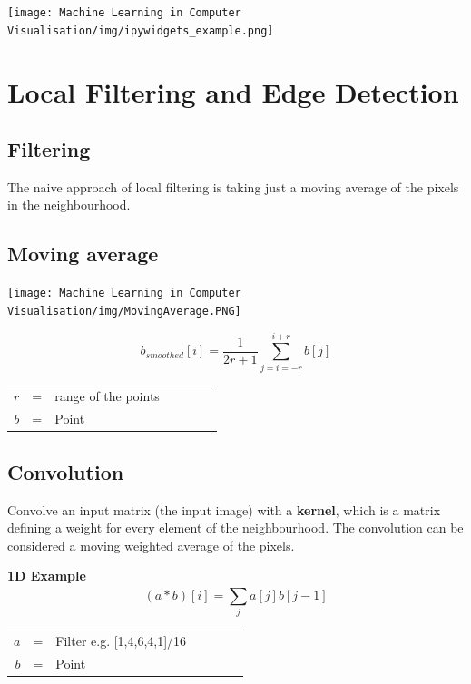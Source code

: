 \documentclass[x11names,11pt,a4paper]{article}
\theoremstyle{definition}
\begin{document}
\begin{center}
	\texttt{[image: Machine Learning in Computer Visualisation/img/ipywidgets\_example.png]}
\end{center}


\section{Local Filtering and Edge Detection}
\subsection{Filtering}
The naive approach of local filtering is taking just a moving average of the pixels in the neighbourhood.

\subsection{Moving average}
\begin{center}
	\texttt{[image: Machine Learning in Computer Visualisation/img/MovingAverage.PNG]}
\end{center}
\begin{equation}
     b_{smoothed}[i] = \frac{1}{2r+1} \sum_{j=i=-r}^{i+r} b[j] 
\end{equation}

 \begin{center}\begin{tabular}{rclcrcl}
   $r$ & = & range of the points  \\ 
   $b$ & = & Point \\
\end{tabular}\end{center}

\subsection{Convolution}
Convolve an input matrix (the input image) with a \textbf{kernel}, which is a matrix defining a weight for every element of the neighbourhood. The convolution can be considered a moving weighted average of the pixels.

\textbf{1D Example}
\begin{equation}
     (a\ast b)[i] = \sum_{j}^{} a[j]b[j-1] 
\end{equation}

 \begin{center}\begin{tabular}{rclcrcl}
   $a$ & = & Filter e.g.  [1,4,6,4,1]/16\\ 
   $b$ & = & Point \\
\end{tabular}\end{center}
\end{document}
